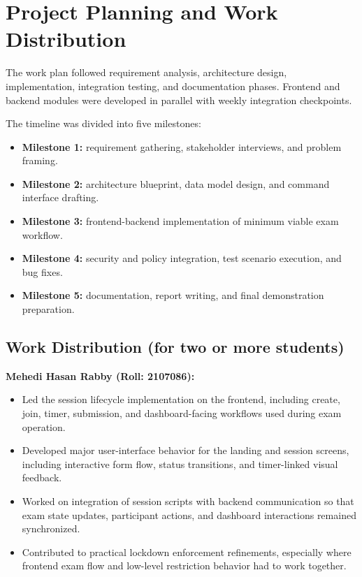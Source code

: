 \documentclass[12pt,a4paper]{report}
\begin{document}
	\section{Project Planning and Work Distribution}
	The work plan followed requirement analysis, architecture design, implementation, integration testing, and documentation phases. Frontend and backend modules were developed in parallel with weekly integration checkpoints.
	
	The timeline was divided into five milestones:
	\begin{itemize}
		\item \textbf{Milestone 1:} requirement gathering, stakeholder interviews, and problem framing.
		\item \textbf{Milestone 2:} architecture blueprint, data model design, and command interface drafting.
		\item \textbf{Milestone 3:} frontend-backend implementation of minimum viable exam workflow.
		\item \textbf{Milestone 4:} security and policy integration, test scenario execution, and bug fixes.
		\item \textbf{Milestone 5:} documentation, report writing, and final demonstration preparation.
	\end{itemize}
	
	\subsection{Work Distribution (for two or more students)}
	
	\noindent\textbf{Mehedi Hasan Rabby (Roll: 2107086):}
	\begin{itemize}
		\item Led the session lifecycle implementation on the frontend, including create, join, timer, submission, and dashboard-facing workflows used during exam operation.
		\item Developed major user-interface behavior for the landing and session screens, including interactive form flow, status transitions, and timer-linked visual feedback.
		\item Worked on integration of session scripts with backend communication so that exam state updates, participant actions, and dashboard interactions remained synchronized.
		\item Contributed to practical lockdown enforcement refinements, especially where frontend exam flow and low-level restriction behavior had to work together.
	\end{itemize}
	
\end{document}
